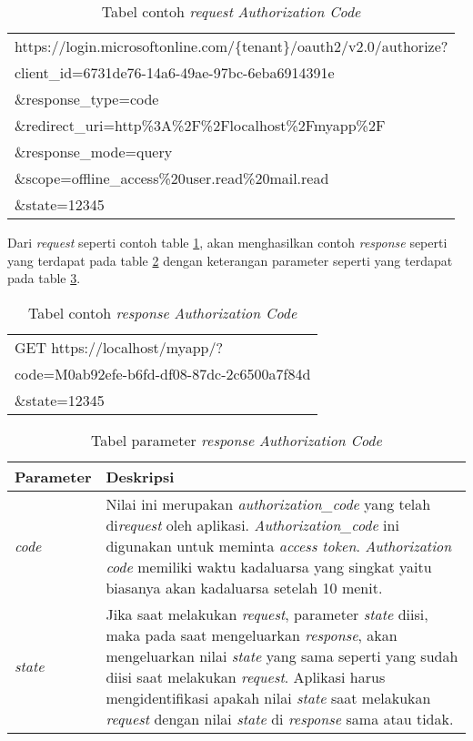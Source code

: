\documentclass[a4paper,twoside]{article}
\begin{document}
\begin{enumerate}
\begin{table}[H]
	\centering 
	\caption{Tabel contoh \textit{request} \textit{Authorization Code}}
	\label{tab:contoh_request_authorization_code}
	\begin{tabular}{|p{12cm}|}
	\hline
	https://login.microsoftonline.com/\{tenant\}/oauth2/v2.0/authorize?\\
client\_id=6731de76-14a6-49ae-97bc-6eba6914391e\\
\&response\_type=code\\
\&redirect\_uri=http\%3A\%2F\%2Flocalhost\%2Fmyapp\%2F\\
\&response\_mode=query\\
\&scope=offline\_access\%20user.read\%20mail.read\\
\&state=12345\\
	\hline
\end{tabular}  
\end{table}

Dari \textit{request} seperti contoh table \ref{tab:contoh_request_authorization_code}, akan menghasilkan contoh \textit{response} seperti yang terdapat pada table \ref{tab:contoh_response_authorization_code} dengan keterangan parameter seperti yang terdapat pada table \ref{tab:parameter_response_authorization_code}. 

\begin{table}[H]
	\centering 
	\caption{Tabel contoh \textit{response} \textit{Authorization Code}}
	\label{tab:contoh_response_authorization_code}
	\begin{tabular}{|p{9cm}|}
	\hline
	GET https://localhost/myapp/?\\
code=M0ab92efe-b6fd-df08-87dc-2c6500a7f84d\\
\&state=12345 \\
	\hline
\end{tabular}  
\end{table}

\begin{table}[H]
	\centering 
	\caption{Tabel parameter \textit{response} \textit{Authorization Code}}
	\label{tab:parameter_response_authorization_code}
	\begin{tabular}{|p{3cm}|p{9cm}|}
	\hline
	\textbf{Parameter} & \textbf{Deskripsi}\\ \hline 
	\textit{code} & Nilai ini merupakan \textit{authorization\_code} yang telah di\textit{request} oleh aplikasi. \textit{Authorization\_code} ini digunakan untuk meminta \textit{access token}. \textit{Authorization code} memiliki waktu kadaluarsa yang singkat yaitu biasanya akan kadaluarsa setelah 10 menit. \\ \hline 
	\textit{state} & Jika saat melakukan \textit{request}, parameter \textit{state} diisi, maka pada saat mengeluarkan \textit{response}, akan mengeluarkan nilai \textit{state} yang sama seperti yang sudah diisi saat melakukan \textit{request}. Aplikasi harus mengidentifikasi apakah nilai \textit{state} saat melakukan \textit{request} dengan nilai \textit{state} di \textit{response} sama atau tidak. \\ \hline
\end{tabular}  
\end{table}


\end{enumerate}
\end{document}
